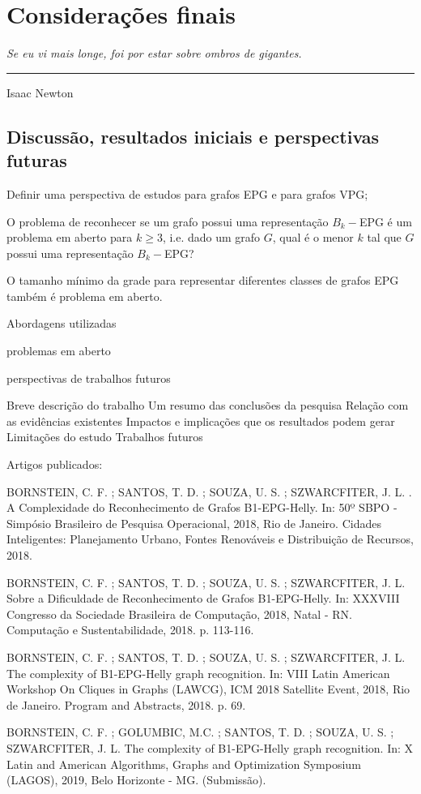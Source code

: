 \chapter{Considerações finais}\label{conclusao}

\begin{flushright}
\begin{minipage}[t][0cm][b]{0.47\textwidth}
\emph{
Se eu vi mais longe, foi por estar sobre ombros de gigantes.}
\end{minipage}

\rule[0cm]{7cm}{0.03cm}%

Isaac Newton
\end{flushright}

\section{Discussão, resultados iniciais e perspectivas futuras}

Definir uma perspectiva de estudos para grafos EPG e para grafos VPG;

 O problema de reconhecer se um grafo possui uma representação $B_{k}-$EPG é um problema em aberto para $k\geq 3$, i.e. dado um grafo $G$, qual é o menor $k$ tal que $G$ possui uma representação $B_{k}-$EPG?

O tamanho mínimo da grade para representar diferentes classes de grafos EPG também é problema em aberto.

Abordagens utilizadas

problemas em aberto

perspectivas de trabalhos futuros

Breve descrição do trabalho
Um resumo das conclusões da pesquisa
Relação com as evidências existentes
Impactos e implicações que os resultados podem gerar
Limitações do estudo
Trabalhos futuros

Artigos publicados:

BORNSTEIN, C. F. ; SANTOS, T. D. ; SOUZA, U. S. ; SZWARCFITER, J. L. . A Complexidade do Reconhecimento de Grafos B1-EPG-Helly. In: 50º SBPO - Simpósio Brasileiro de Pesquisa Operacional, 2018, Rio de Janeiro. Cidades Inteligentes: Planejamento Urbano, Fontes Renováveis e Distribuição de Recursos, 2018.

BORNSTEIN, C. F. ; SANTOS, T. D. ; SOUZA, U. S. ; SZWARCFITER, J. L. Sobre a Dificuldade de Reconhecimento de Grafos B1-EPG-Helly. In: XXXVIII Congresso da Sociedade Brasileira de Computação, 2018, Natal - RN. Computação e Sustentabilidade, 2018. p. 113-116.

BORNSTEIN, C. F. ; SANTOS, T. D. ; SOUZA, U. S. ; SZWARCFITER, J. L. The complexity of B1-EPG-Helly graph recognition. In: VIII Latin American Workshop On Cliques in Graphs (LAWCG), ICM 2018 Satellite Event, 2018, Rio de Janeiro. Program and Abstracts, 2018. p. 69.

BORNSTEIN, C. F. ; GOLUMBIC, M.C. ; SANTOS, T. D. ; SOUZA, U. S. ; SZWARCFITER, J. L.  The complexity of B1-EPG-Helly graph recognition. In:  X Latin and American Algorithms, Graphs and Optimization Symposium (LAGOS),  2019, Belo Horizonte - MG. (Submissão).